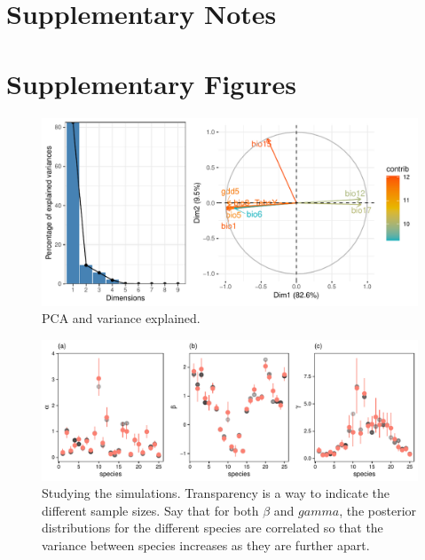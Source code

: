 \documentclass[11pt, a4paper]{article}
\begin{document}
\section*{Supplementary Notes}
\section*{Supplementary Figures}

\begin{figure}[ht]
  \centering
    \vspace{0.5cm}
    \includegraphics[width=1\textwidth]{figures/variances}
    	  \vspace{0.3cm}
	   \caption{PCA and variance explained.}
      \label{sfig:pca}
\end{figure}

\clearpage


\begin{figure}[ht]
  \centering
    \vspace{0.5cm}
    \includegraphics[width=1\textwidth]{figures/simulations-comparison}
    	  \vspace{0.3cm}
	   \caption{Studying the simulations. Transparency is a way to indicate the different sample sizes. Say that for both $\beta$ and $gamma$, the posterior distributions for the different species are correlated so that the variance between species increases as they are further apart.}
      \label{sfig:simulations}
\end{figure}
\end{document}
